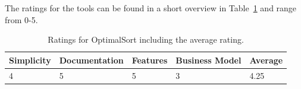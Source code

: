 The ratings for the tools can be found in a short overview in
Table~\ref{tab:rating-OptimalSort} and range from 0-5.



\begin{table}[tpb] 
\centering 
\begin{tabularx}{\linewidth}{|X|X|X|X|X|}
\hline
Simplicity & Documentation & Features & Business Model & Average \\ 
\hline 
4 & 5 & 5 & 3 & 4.25 \\ 
\hline 
\end{tabularx} 
\caption[Ratings for OptimalSort] {
Ratings for OptimalSort including the average rating.
} 
\label{tab:rating-OptimalSort}
\end{table}


